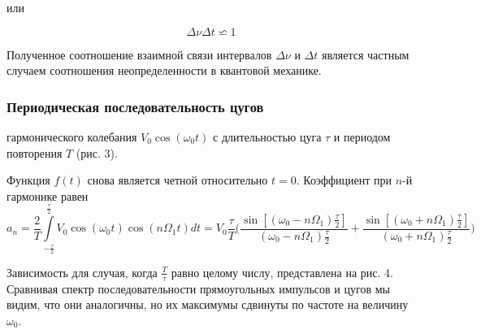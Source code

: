 \documentclass[a4paper, 12pt]{article}
\begin{document}
                или

                \begin{equation}\label{neopr}
                    \Delta \nu \Delta t \backsimeq 1
                \end{equation}

                Полученное соотношение взаимной связи интервалов $\Delta \nu$ и $\Delta t$ является частным случаем соотношения неопределенности в квантовой механике.

            \subsubsection{Периодическая последовательность цугов}

                гармонического колебания $V_{0}\cos(\omega_{0}t)$ с длительностью цуга $\tau$ и периодом повторения $T$ (рис. 3).

                Функция $f(t)$ снова является четной относительно $t=0$. Коэффициент при $n$-й гармонике равен
                \begin{equation}
                    a_{n}=\dfrac{2}{T}\int\limits_{-\frac{\tau}{2}}^{\frac{\tau}{2}}V_{0}\cos(\omega_{0}t)\cos(n \Omega_{1} t)dt=V_{0}\dfrac{\tau}{T} \bigg(\dfrac{\sin[(\omega_{0}-n\Omega_{1})\frac{\tau}{2}]}{(\omega_{0}-n\Omega_{1})\frac{\tau}{2}}+\dfrac{\sin[(\omega_{0}+n\Omega_{1})\frac{\tau}{2}]}{(\omega_{0}+n\Omega_{1})\frac{\tau}{2}} \bigg)
                    \label{eq6}
                \end{equation}

                Зависимость для случая, когда $\frac{T}{\tau}$ равно целому числу, представлена на рис. 4. Сравнивая спектр последовательности прямоугольных импульсов и цугов мы видим, что они аналогичны, но их максимумы сдвинуты по частоте на величину $\omega_{0}$.
\end{document}
